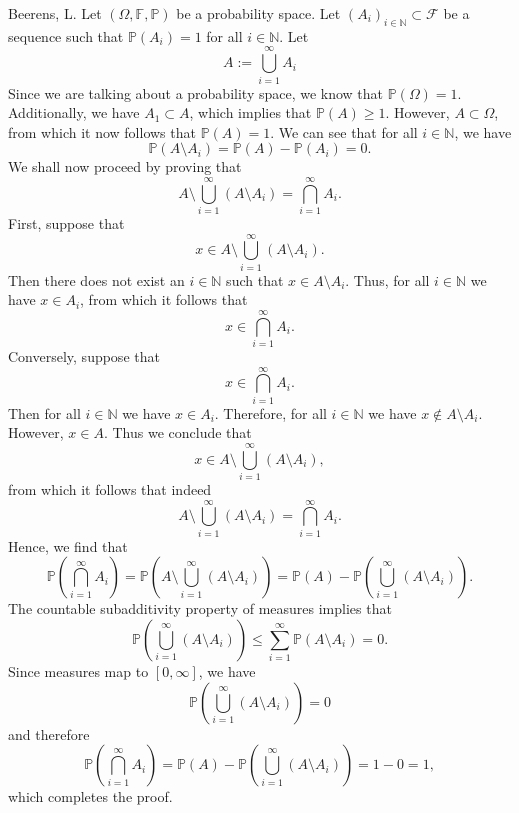 \begin{solution}[3.22]{Beerens, L.}
    Let $(\Omega, \mathbb{F}, \mathbb{P})$ be a probability space. Let $(A_i)_{i\in\mathbb{N}}\subset\mathcal{F}$ be a sequence such that $\mathbb{P}(A_i) = 1$ for all $i\in\mathbb{N}$. Let
    $$
        A:=\bigcup_{i=1}^\infty A_i
    $$
    Since we are talking about a probability space, we know that $\mathbb{P}(\Omega) = 1$. Additionally, we have $A_1\subset A$, which implies that $\mathbb{P}(A)\geq 1$. However, $A\subset \Omega$, from which it now follows that $\mathbb{P}(A) = 1$. We can see that for all $i\in\mathbb{N}$, we have
    $$
        \mathbb{P}(A\setminus A_i) = \mathbb{P}(A) - \mathbb{P}(A_i) = 0.
    $$
    We shall now proceed by proving that 
    $$
        A\setminus\bigcup_{i=1}^\infty(A\setminus A_i) = \bigcap_{i=1}^\infty A_i.
    $$
    First, suppose that 
    $$
        x\in A\setminus\bigcup_{i=1}^\infty(A\setminus A_i).
    $$
    Then there does not exist an $i\in\mathbb{N}$ such that $x\in A\setminus A_i$. Thus, for all $i\in\mathbb{N}$ we have $x\in A_i$, from which it follows that 
    $$
        x\in\bigcap_{i=1}^\infty A_i.
    $$
    Conversely, suppose that 
    $$
        x\in\bigcap_{i=1}^\infty A_i.
    $$
    Then for all $i\in\mathbb{N}$ we have $x\in A_i$. Therefore, for all $i\in\mathbb{N}$ we have $x\notin A\setminus A_i$. However, $x\in A$. Thus we conclude that
    $$
        x\in A\setminus\bigcup_{i=1}^\infty(A\setminus A_i),
    $$
    from which it follows that indeed
    $$
        A\setminus\bigcup_{i=1}^\infty(A\setminus A_i) = \bigcap_{i=1}^\infty A_i.
    $$
    Hence, we find that
    $$
        \mathbb{P}\left( \bigcap_{i=1}^\infty A_i \right) = \mathbb{P}\left( A\setminus\bigcup_{i=1}^\infty(A\setminus A_i) \right) = \mathbb{P}(A) - \mathbb{P}\left( \bigcup_{i=1}^\infty(A\setminus A_i) \right).
    $$
    The countable subadditivity property of measures implies that
    $$
        \mathbb{P}\left( \bigcup_{i=1}^\infty(A\setminus A_i) \right)\leq\sum_{i=1}^\infty \mathbb{P}(A\setminus A_i)=0.
    $$
    Since measures map to $[0,\infty]$, we have
    $$
        \mathbb{P}\left( \bigcup_{i=1}^\infty(A\setminus A_i) \right)=0
    $$
    and therefore
    $$
        \mathbb{P}\left( \bigcap_{i=1}^\infty A_i \right) = \mathbb{P}(A) - \mathbb{P}\left( \bigcup_{i=1}^\infty(A\setminus A_i) \right) = 1-0=1,
    $$
    which completes the proof.
\end{solution}